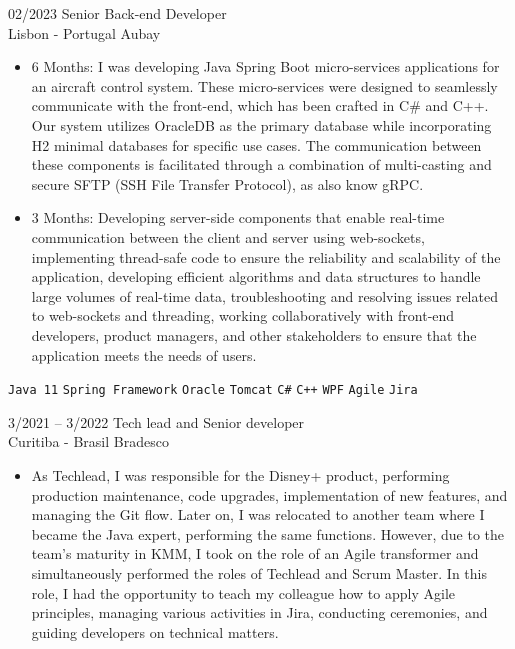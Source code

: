 \documentclass[9pt]{developercv} %
\begin{document}
\begin{entrylist}
	\entry
        {02/2023}
		{Senior Back-end Developer \\\footnotesize{Lisbon - Portugal}}
		{Aubay}
		{\vspace{-10pt}
        \begin{itemize}[noitemsep,topsep=0pt,parsep=0pt,partopsep=0pt, leftmargin=-1pt]
            \setlength\itemsep{1em}
            \item 6 Months: I was developing Java Spring Boot micro-services applications for an aircraft control system. These micro-services were designed to seamlessly communicate with the front-end, which has been crafted in C# and C++. Our system utilizes OracleDB as the primary database while incorporating H2 minimal databases for specific use cases. The communication between these components is facilitated through a combination of multi-casting and secure SFTP (SSH File Transfer Protocol), as also know gRPC.
            \item 3 Months: Developing server-side components that enable real-time communication between the client and server using web-sockets, implementing thread-safe code to ensure the reliability and scalability of the application, developing efficient algorithms and data structures to handle large volumes of real-time data, troubleshooting and resolving issues related to web-sockets and threading, working collaboratively with front-end developers, product managers, and other stakeholders to ensure that the application meets the needs of users.
        \end{itemize} 
        \texttt{Java 11} \slashsep \texttt{Spring Framework} \slashsep \texttt{Oracle} \slashsep \texttt{Tomcat} \slashsep \texttt{C\#} \slashsep \texttt{C++} \slashsep \texttt{WPF} \slashsep \texttt{Agile} \slashsep \texttt{Jira} }
	\entry
		{3/2021 -- 3/2022}
		{Tech lead and Senior developer \\\footnotesize{Curitiba - Brasil}}
		{Bradesco}
		{\vspace{-10pt}
        \begin{itemize}[noitemsep,topsep=0pt,parsep=0pt,partopsep=0pt, leftmargin=-1pt]
            \item As Techlead, I was responsible for the Disney+ product, performing production maintenance, code upgrades, implementation of new features, and managing the Git flow. Later on, I was relocated to another team where I became the Java expert, performing the same functions. However, due to the team's maturity in KMM, I took on the role of an Agile transformer and simultaneously performed the roles of Techlead and Scrum Master. In this role, I had the opportunity to teach my colleague how to apply Agile principles, managing various activities in Jira, conducting ceremonies, and guiding developers on technical matters.

\end{itemize}}
\end{entrylist}
\end{document}
